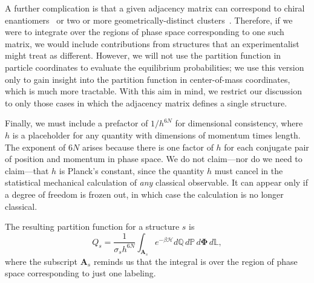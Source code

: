 \documentclass[pre, aps, twocolumn, reprint, amsmath,amssymb, showpacs,
superscriptaddress] {revtex4-1}
\begin{document}
A further complication is that a given adjacency matrix can correspond
to chiral enantiomers~\cite{arkus_deriving_2011} or two or more
geometrically-distinct clusters~\cite{holmes-cerfon_enumerating_2016}.
Therefore, if we were to integrate over the regions of phase space
corresponding to one such matrix, we would include contributions from
structures that an experimentalist might treat as different. However, we
will not use the partition function in particle coordinates to evaluate
the equilibrium probabilities; we use this version only to gain insight
into the partition function in center-of-mass coordinates, which is much
more tractable. With this aim in mind, we restrict our discussion to
only those cases in which the adjacency matrix defines a single
structure.

Finally, we must include a prefactor of $1/h^{6N}$ for dimensional
consistency, where $h$ is a placeholder for any quantity with dimensions
of momentum times length. The exponent of $6N$ arises because there is
one factor of $h$ for each conjugate pair of position and momentum in
phase space. We do not claim---nor do we need to claim---that $h$ is
Planck's constant, since the quantity $h$ must cancel in the statistical
mechanical calculation of \emph{any} classical observable. It can appear
only if a degree of freedom is frozen out, in which case the calculation
is no longer classical.

The resulting partition function for a structure $s$ is
\begin{equation}
  Q_s = \frac{1}{\sigma_s h^{6N}} \int_{\mathbf{A}_s}{e^{-\beta
      \mathcal{H} } }d\mathbb{Q} \, d\mathbb{P} \, d\bm{\Phi} \,
  d\mathbb{L},
\end{equation}
where the subscript $\mathbf{A}_s$ reminds us that the integral is over
the region of phase space corresponding to just one labeling.
\end{document}
